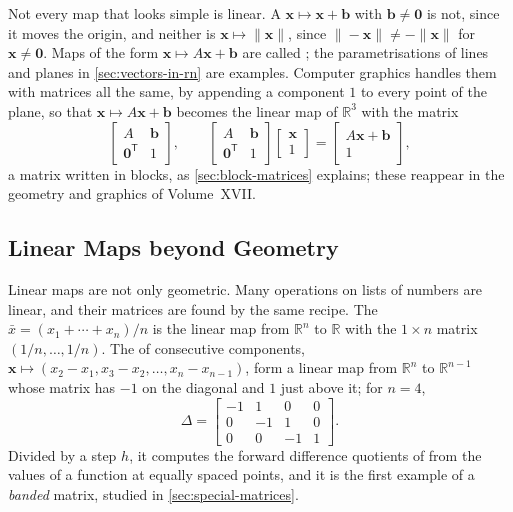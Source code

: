 Not every map that looks simple is linear. A  $\mathbf x\mapsto\mathbf x+\mathbf b$ with $\mathbf b\ne\mathbf 0$ is not, since it moves the origin, and neither is $\mathbf x\mapsto\|\mathbf x\|$, since $\|-\mathbf x\|\ne-\|\mathbf x\|$ for $\mathbf x\ne\mathbf 0$. Maps of the form $\mathbf x\mapsto A\mathbf x+\mathbf b$ are called ; the parametrisations of lines and planes in \cref{sec:vectors-in-rn} are examples. Computer graphics handles them with matrices all the same, by appending a component $1$ to every point of the plane, so that $\mathbf x\mapsto A\mathbf x+\mathbf b$ becomes the linear map of $\mathbb R^3$ with the matrix
\[
\begin{bmatrix}A&\mathbf b\\\mathbf 0^{\mathsf T}&1\end{bmatrix},\qquad\begin{bmatrix}A&\mathbf b\\\mathbf 0^{\mathsf T}&1\end{bmatrix}\begin{bmatrix}\mathbf x\\1\end{bmatrix}=\begin{bmatrix}A\mathbf x+\mathbf b\\1\end{bmatrix},
\]
a matrix written in blocks, as \cref{sec:block-matrices} explains; these  reappear in the geometry and graphics of Volume~XVII.

\subsection{Linear Maps beyond Geometry}

Linear maps are not only geometric. Many operations on lists of numbers are linear, and their matrices are found by the same recipe. The  $\bar x=(x_1+\cdots+x_n)/n$ is the linear map from $\mathbb R^n$ to $\mathbb R$ with the $1\times n$ matrix $(1/n,\ldots,1/n)$. The  of consecutive components, $\mathbf x\mapsto(x_2-x_1,x_3-x_2,\ldots,x_n-x_{n-1})$, form a linear map from $\mathbb R^n$ to $\mathbb R^{n-1}$ whose matrix has $-1$ on the diagonal and $1$ just above it; for $n=4$,
\[
\Delta=\begin{bmatrix}-1&1&0&0\\0&-1&1&0\\0&0&-1&1\end{bmatrix}.
\]
Divided by a step $h$, it computes the forward difference quotients of  from the values of a function at equally spaced points, and it is the first example of a \emph{banded} matrix, studied in \cref{sec:special-matrices}.

